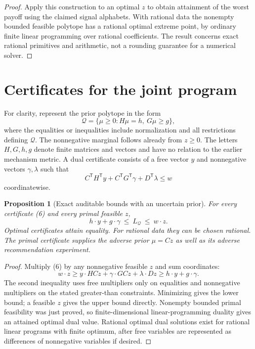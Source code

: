 \documentclass[11pt]{article}
\newtheorem{proposition}[theorem]{Proposition}
\theoremstyle{definition}
\theoremstyle{remark}
\begin{document}
\begin{proof}
Apply this construction to an optimal $z$ to obtain attainment of the
worst payoff using the claimed signal alphabets. With rational data the
nonempty bounded feasible polytope has a rational optimal extreme
point, by ordinary finite linear programming over rational coefficients.
The result concerns exact rational primitives and arithmetic, not a
rounding guarantee for a numerical solver.
\end{proof}

\section{Certificates for the joint program}
For clarity, represent the prior polytope in the form
\[
 \mathcal Q=\{\mu\geq0:H\mu=h,\ G\mu\geq g\},
\]
where the equalities or inequalities include normalization and all
restrictions defining $\mathcal Q$. The nonnegative marginal follows
already from $z\geq0$. The letters $H,G,h,g$ denote finite matrices
and vectors and have no relation to the earlier mechanism metric.
A dual certificate consists of a free vector $y$ and nonnegative
vectors $\gamma,\lambda$ such that
\[
 C^{\mathsf T}H^{\mathsf T}y+
 C^{\mathsf T}G^{\mathsf T}\gamma+D^{\mathsf T}\lambda
 \leq w                                                   \tag{6}
\]
coordinatewise.

\begin{proposition}[Exact auditable bounds with an uncertain prior]
For every certificate (6) and every primal feasible $z$,
\[
 h\cdot y+g\cdot\gamma\ \leq\ L_{\mathcal Q}\ \leq\ w\cdot z.
\]
Optimal certificates attain equality. For rational data they can be
chosen rational. The primal certificate supplies the adverse prior
$\mu=Cz$ as well as its adverse recommendation experiment.
\end{proposition}
\begin{proof}
Multiply (6) by any nonnegative feasible $z$ and sum coordinates:
\[
 w\cdot z\geq y\cdot HCz+\gamma\cdot GCz+\lambda\cdot Dz
 \geq h\cdot y+g\cdot\gamma.
\]
The second inequality uses free multipliers only on equalities and
nonnegative multipliers on the stated greater-than constraints.
Minimizing gives the lower bound; a feasible $z$ gives the upper
bound directly. Nonempty bounded primal feasibility was just proved,
so finite-dimensional linear-programming duality gives an attained
optimal dual value. Rational optimal dual solutions exist for rational
linear programs with finite optimum, after free variables are represented
as differences of nonnegative variables if desired.
\end{proof}
\end{document}
